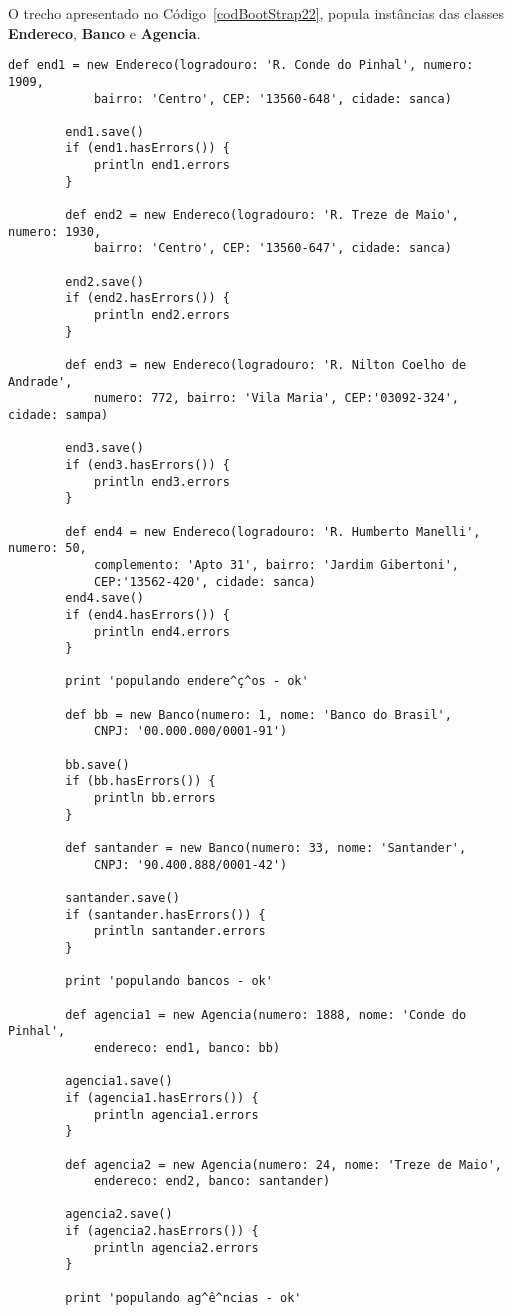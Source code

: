 \newpage

O  trecho  apresentado  no  Código~\ref{codBootStrap22}, popula  instâncias  das
classes {\bf Endereco}, {\bf Banco} e {\bf Agencia}.  

\begin{lstlisting}[caption={\bf BootStrap.groovy (2)}, frame = trBL, float=htbp,
    label=codBootStrap22] 
        def end1 = new Endereco(logradouro: 'R. Conde do Pinhal', numero: 1909, 
            bairro: 'Centro', CEP: '13560-648', cidade: sanca)

        end1.save()
        if (end1.hasErrors()) {
            println end1.errors
        }
        
        def end2 = new Endereco(logradouro: 'R. Treze de Maio', numero: 1930, 
            bairro: 'Centro', CEP: '13560-647', cidade: sanca)

        end2.save()
        if (end2.hasErrors()) {
            println end2.errors
        }
        
        def end3 = new Endereco(logradouro: 'R. Nilton Coelho de Andrade',
            numero: 772, bairro: 'Vila Maria', CEP:'03092-324', cidade: sampa)

        end3.save()
        if (end3.hasErrors()) {
            println end3.errors
        }
        
        def end4 = new Endereco(logradouro: 'R. Humberto Manelli', numero: 50, 
            complemento: 'Apto 31', bairro: 'Jardim Gibertoni', 
            CEP:'13562-420', cidade: sanca)
        end4.save()
        if (end4.hasErrors()) {
            println end4.errors
        }
        
        print 'populando endere^ç^os - ok'
        
        def bb = new Banco(numero: 1, nome: 'Banco do Brasil', 
            CNPJ: '00.000.000/0001-91')
        
        bb.save()
        if (bb.hasErrors()) {
            println bb.errors
        }
        
        def santander = new Banco(numero: 33, nome: 'Santander', 
            CNPJ: '90.400.888/0001-42')
        
        santander.save()
        if (santander.hasErrors()) {
            println santander.errors
        }

        print 'populando bancos - ok'
        
        def agencia1 = new Agencia(numero: 1888, nome: 'Conde do Pinhal', 
            endereco: end1, banco: bb)
        
        agencia1.save()
        if (agencia1.hasErrors()) {
            println agencia1.errors
        }
        
        def agencia2 = new Agencia(numero: 24, nome: 'Treze de Maio', 
            endereco: end2, banco: santander)
        
        agencia2.save()
        if (agencia2.hasErrors()) {
            println agencia2.errors
        }
        
        print 'populando ag^ê^ncias - ok'
\end{lstlisting}

